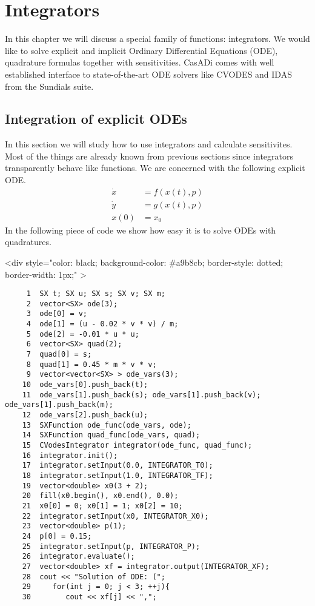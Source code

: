 \documentclass[a4paper,12pt]{book}
\newcommand{\codebegin}{
\begin{rawhtml}
<div style="color: black; background-color: \#a9b8cb;  border-style: dotted; border-width: 1px;" >
\end{rawhtml}
}
\begin{document}
{\chapter{Integrators \label{chapter:integrators}}
In this chapter we will discuss a special family of functions: integrators. We would like to solve explicit and implicit 
Ordinary Differential Equations (ODE), quadrature formulas together with sensitivities. CasADi comes with well established
interface to state-of-the-art ODE solvers like CVODES and IDAS from the Sundials suite.
\section{Integration of explicit ODEs}
In this section we will study how to use integrators and calculate sensitivites. Most of the things are already known from previous sections
since integrators transparently behave like functions. We are concerned with the following explicit ODE.
\begin{align}
\dot{x} &= f(x(t), p)\\
\dot{y} &= g(x(t), p)\\
x(0) &= x_0
\end{align}
In the following piece of code we show how easy it is to solve ODEs with quadratures.
\par
\codebegin
\begin{verbatim}
     1  SX t; SX u; SX s; SX v; SX m;
     2  vector<SX> ode(3);
     3  ode[0] = v;
     4  ode[1] = (u - 0.02 * v * v) / m;
     5  ode[2] = -0.01 * u * u;
     6  vector<SX> quad(2);
     7  quad[0] = s;
     8  quad[1] = 0.45 * m * v * v;
     9  vector<vector<SX> > ode_vars(3);
    10  ode_vars[0].push_back(t);
    11  ode_vars[1].push_back(s); ode_vars[1].push_back(v); ode_vars[1].push_back(m);
    12  ode_vars[2].push_back(u);
    13  SXFunction ode_func(ode_vars, ode);
    14  SXFunction quad_func(ode_vars, quad);
    15  CVodesIntegrator integrator(ode_func, quad_func);
    16  integrator.init();
    17  integrator.setInput(0.0, INTEGRATOR_T0);
    18  integrator.setInput(1.0, INTEGRATOR_TF);
    19  vector<double> x0(3 + 2);
    20  fill(x0.begin(), x0.end(), 0.0);
    21  x0[0] = 0; x0[1] = 1; x0[2] = 10;
    22  integrator.setInput(x0, INTEGRATOR_X0);
    23  vector<double> p(1);
    24  p[0] = 0.15;
    25  integrator.setInput(p, INTEGRATOR_P);
    26  integrator.evaluate();
    27  vector<double> xf = integrator.output(INTEGRATOR_XF);
    28  cout << "Solution of ODE: (";
    29     for(int j = 0; j < 3; ++j){
    30        cout << xf[j] << ",";

\end{verbatim}}
\end{document}
